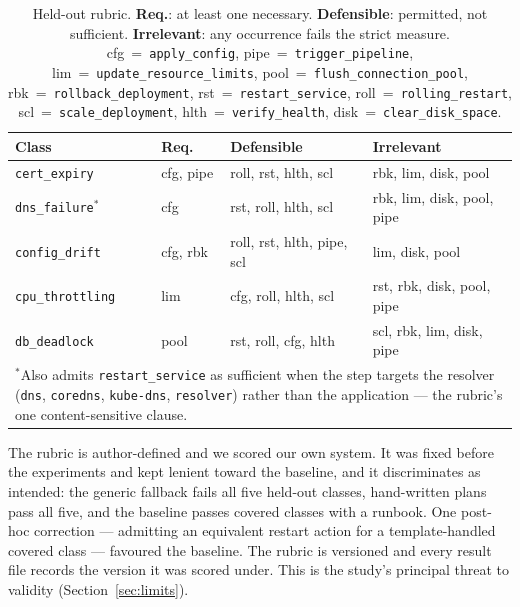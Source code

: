 \documentclass[conference]{IEEEtran}
\begin{document}
\begin{table}[htbp]
\caption{Held-out rubric. \textbf{Req.}: at least one necessary.
\textbf{Defensible}: permitted, not sufficient. \textbf{Irrelevant}: any
occurrence fails the strict measure. cfg~=~\texttt{apply\_config},
pipe~=~\texttt{trigger\_pipeline},
lim~=~\texttt{update\_resource\_limits},
pool~=~\texttt{flush\_connection\_pool},
rbk~=~\texttt{rollback\_deployment}, rst~=~\texttt{restart\_service},
roll~=~\texttt{rolling\_restart}, scl~=~\texttt{scale\_deployment},
hlth~=~\texttt{verify\_health}, disk~=~\texttt{clear\_disk\_space}.}
\label{tab:rubric}
\centering
\scriptsize\setlength{\tabcolsep}{4pt}
\renewcommand{\arraystretch}{0.9}
\begin{tabular}{@{}llll@{}}
\toprule
\textbf{Class} & \textbf{Req.} & \textbf{Defensible} & \textbf{Irrelevant} \\
\midrule
\texttt{cert\_expiry}    & cfg, pipe & roll, rst, hlth, scl      & rbk, lim, disk, pool \\
\texttt{dns\_failure}$^{\ast}$ & cfg  & rst, roll, hlth, scl      & rbk, lim, disk, pool, pipe \\
\texttt{config\_drift}   & cfg, rbk  & roll, rst, hlth, pipe, scl & lim, disk, pool \\
\texttt{cpu\_throttling} & lim       & cfg, roll, hlth, scl      & rst, rbk, disk, pool, pipe \\
\texttt{db\_deadlock}    & pool      & rst, roll, cfg, hlth      & scl, rbk, lim, disk, pipe \\
\bottomrule
\multicolumn{4}{p{8.2cm}}{\scriptsize $^{\ast}$Also admits
\texttt{restart\_service} as sufficient when the step targets the
resolver (\texttt{dns}, \texttt{coredns}, \texttt{kube-dns},
\texttt{resolver}) rather than the application --- the rubric's one
content-sensitive clause.} \\
\end{tabular}
\renewcommand{\arraystretch}{1}
\end{table}

\label{sec:rubricthreats}
The rubric is author-defined and we scored our own system. It was fixed
before the experiments and kept lenient toward the baseline, and it
discriminates as intended: the generic fallback fails all five held-out
classes, hand-written plans pass all five, and the baseline passes
covered classes with a runbook. One post-hoc correction --- admitting an
equivalent restart action for a template-handled covered class ---
favoured the baseline. The rubric is versioned and every result file
records the version it was scored under. This is the study's principal
threat to validity (Section~\ref{sec:limits}).
\end{document}

